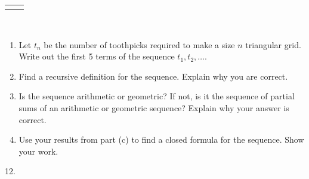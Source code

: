 \documentclass[10pt,]{book}
\theoremstyle{plain}
\theoremstyle{definition}
\theoremstyle{definition}
\theoremstyle{definition}
\theoremstyle{definition}
\numberwithin{equation}{chapter}
\newlength{\panelmax}
\begin{document}
\begin{exerciselist}
{\begin{lrbox}{\panelboxBimage}
{{
}
}\end{lrbox}
\ifdefined\phBimage\else\newlength{\phBimage}\fi%
\setlength{\phBimage}{\ht\panelboxBimage+\dp\panelboxBimage}
\settototalheight{\phBimage}{\usebox{\panelboxBimage}}
\setlength{\panelmax}{\maxof{\panelmax}{\phBimage}}
\leavevmode%
\setlength{\tabcolsep}{0.14\linewidth}
\par\medskip\noindent
\hspace*{0.14\linewidth}%
\begin{tabular}{@{}*{2}{c}@{}}
\begin{minipage}[c][\panelmax][b]{0.16\linewidth}\usebox{\panelboxAimage}\end{minipage}&
\begin{minipage}[c][\panelmax][b]{0.28\linewidth}\usebox{\panelboxBimage}\end{minipage}\end{tabular}\\
}%
\par
\hypertarget{p-218}{}%
\leavevmode%
\begin{enumerate}[label=(\alph*)]
\item\hypertarget{li-129}{}\hypertarget{p-219}{}%
Let \(t_n\) be the number of toothpicks required to make a size \(n\) triangular grid. Write out the first 5 terms of the sequence \(t_1, t_2, \ldots\). %
\item\hypertarget{li-130}{}\hypertarget{p-220}{}%
Find a recursive definition for the sequence. Explain why you are correct. %
\item\hypertarget{li-131}{}\hypertarget{p-221}{}%
Is the sequence arithmetic or geometric? If not, is it the sequence of partial sums of an arithmetic or geometric sequence? Explain why your answer is correct. %
\item\hypertarget{li-132}{}\hypertarget{p-222}{}%
Use your results from part (c) to find a closed formula for the sequence. Show your work. %
\end{enumerate}
%
\par\smallskip
\item[12.]\hypertarget{exercise-21}{}\hypertarget{p-223}{}%

\end{exerciselist}
\end{document}
